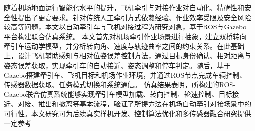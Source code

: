 \begin{abstractzh}


    随着机场地面运行智能化水平的提升，飞机牵引与对接作业对自动化、精确性和安全性提出了更高要求。针对传统人工牵引方式依赖经验、作业效率受限及安全风险较高等问题，本文以自动牵引车与飞机对接过程为研究对象，基于ROS与Gazebo平台构建联合仿真系统。
    本文首先对机场牵引作业场景进行抽象，建立双桥转向牵引车运动学模型，并分析转向角、速度与轨迹曲率之间的约束关系。在此基础上，设计飞机辅助感知与相对位姿误差控制方法，通过目标身份确认、相对距离与姿态误差获取，实现牵引车的自动接近、姿态调整和停车判定。随后，基于Gazebo搭建牵引车、飞机目标和机场作业环境，并通过ROS节点完成车辆控制、传感器数据获取、任务模式切换和系统通信。
    仿真结果表明，所构建的ROS-Gazebo联合仿真系统能够实现牵引车模型加载、转向控制、轮速控制、目标接近、对接、推出和撤离等基本流程，验证了所提方法在机场自动牵引对接场景中的可行性。本文研究可为后续真实样机开发、控制算法优化和多传感器融合研究提供一定参考
    
    


\end{abstractzh}
